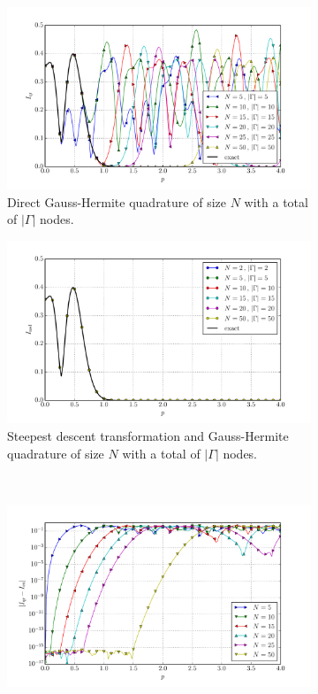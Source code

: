 \documentclass[a4paper,10pt]{article}
\begin{document}
\begin{figure}[ht!]
  \begin{subfigure}[t]{0.5\linewidth}
    \includegraphics[width=\linewidth]{./plots/tp_1d_conv_p_2_1_val_qr.pdf}
    \caption{Direct Gauss-Hermite quadrature of size $N$ with a total of $|\Gamma|$ nodes.}
    \label{fig:tp_1d_conv_p_2_1_val_qr}
  \end{subfigure}
  \begin{subfigure}[t]{0.5\linewidth}
    \includegraphics[width=\linewidth]{./plots/tp_1d_conv_p_2_1_val_nsd.pdf}
    \caption{Steepest descent transformation and Gauss-Hermite quadrature of size $N$ with a total of $|\Gamma|$ nodes.}
    \label{fig:tp_1d_conv_p_2_1_val_nsd}
  \end{subfigure} \\
  \begin{subfigure}[t]{0.5\linewidth}
    \includegraphics[width=\linewidth]{./plots/tp_1d_conv_p_2_1_err_qr.pdf}

\end{subfigure}
\end{figure}
\end{document}
